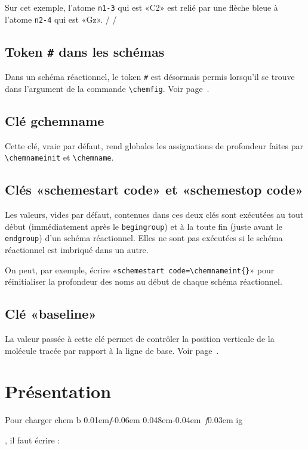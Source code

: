 \documentclass[10pt,french]{article}
\makeatletter
\newcommand\make@car@active[1]{%
	\catcode`#1\active
	\begingroup
		\lccode`\~`#1\relax
		\lowercase{\endgroup\def~}%
}
\newif\if@exstar
\newcommand\exemple{%
	\begingroup
	\parskip\z@
	\@makeother\;\@makeother\!\@makeother\?\@makeother\:%
	\@ifstar{\@exstartrue\exemple@}{\@exstarfalse\exemple@}}
\newcommand\exemple@[2][65]{%
	\medbreak\noindent
	\begingroup
		\let\do\@makeother\dospecials
		\make@car@active\ { {}}%
		\make@car@active\^^M{\par\leavevmode}%
		\make@car@active\^^I{\space\space}%
		\make@car@active\,{\leavevmode\kern\z@\string,}%
		\make@car@active\-{\leavevmode\kern\z@\string-}%
		\make@car@active\>{\leavevmode\kern\z@\string>}%
		\make@car@active\<{\leavevmode\kern\z@\string<}%
		\exemple@@{#1}{#2}%
}
\newcommand\exemple@@[3]{%
	\def\@tempa##1#3{\exemple@@@{#1}{#2}{##1}}%
	\@tempa
}
\newcommand\exemple@@@[3]{%
	\xdef\the@code{#3}%
	\endgroup
	\if@exstar
		\begingroup
			\fboxrule0.4pt
			\let\breakboxparindent\z@
			\def\bkvz@bottom{\hrule\@height\fboxrule}%
			\let\bkvz@before@breakbox\relax
			\def\bkvz@set@linewidth{\advance\linewidth\dimexpr-2\fboxrule-2\fboxsep}%
			\def\bkvz@left{\vrule\@width\fboxrule\hskip\fboxsep}%
			\def\bkvz@right{\hskip\fboxsep\vrule\@width\fboxrule}%
			\def\bkvz@top{\hbox to \hsize{%
				\vrule\@width\fboxrule\@height\fboxrule
				\leaders\bkvz@bottom\hfill
				\sffamily
				\fboxsep\z@
				\colorbox{black}{\kern0.25em\color{white}\footnotesize\lower0.5ex\hbox{\strut#2}\kern0.25em}%
				\leaders\bkvz@bottom\hfill
				\vrule\@width\fboxrule\@height\fboxrule}}%
			\breakbox
				\kern.5ex\relax
				\ttfamily\footnotesize\the@code\par
				\normalfont
				\kern3pt
				\hrule height0.1pt width\linewidth depth0.1pt
				\vskip5pt
				\rightskip0pt plus 1fill
				\everypar{{\color{lightgray}\rlap{\vrule height0.1pt width\linewidth depth0.1pt}}\hskip0pt plus 1fill}%
				\newlinechar`\^^M\everyeof{\noexpand}\scantokens{#3}\par
			\endbreakbox
		\endgroup
	\else
		\vskip0.5ex
		\boxput*(0,1)
			{\fboxsep\z@
			\hbox{\sffamily\colorbox{black}{\leavevmode\kern0.25em{\color{white}\footnotesize\strut#2}\kern0.25em}}%
			}%
			{\fboxsep5pt
			\fbox{%
				$\vcenter{\hsize\dimexpr0.#1\linewidth-\fboxsep-\fboxrule\relax
					\kern5pt\parskip0pt \ttfamily\footnotesize\the@code}%
				\vcenter{\kern5pt\hsize\dimexpr\linewidth-0.#1\linewidth-\fboxsep-\fboxrule\relax
					\everypar{{\color{lightgray}\rlap{\vrule height0.1pt width\dimexpr\linewidth-0.#1\linewidth-\fboxsep-\fboxrule depth0.1pt}}}%
					\footnotesize\newlinechar`\^^M\everyeof{\noexpand}\scantokens{#3}}$%
				}%
			}%
	\fi
	\medbreak
	\endgroup
}
\DeclareRobustCommand\CF{%
	\textsf{%
		chem%
		\if\string b\detokenize\expandafter{\f@series}%
			\lower0.01em\hbox{\itshape f}\kern-0.06em
		\else
			\lower0.048em\hbox{\kern-0.04em \itshape f}\kern0.03em
		\fi ig%
		}%
		\xspace
}
\makeatother
\begin{document}
Sur cet exemple, l'atome \verb|n1-3| qui est «C2» est relié par une flèche bleue à l'atome \verb|n2-4| qui est «Gz».
\exemple{Nom des nœuds}/
/

\subsection{Token \texttt\# dans les schémas}
Dans un schéma réactionnel, le token \verb|#| est désormais permis lorsqu'il se trouve dans l'argument de la commande \verb|\chemfig|. Voir  page~\pageref{modif.retrait}.

\subsection{Clé gchemname}
Cette clé, vraie par défaut, rend globales les assignations de profondeur faites par \verb|\chemnameinit| et \verb|\chemname|.

\subsection{Clés «schemestart code» et «schemestop code»}
Les valeurs, vides par défaut, contenues dans ces deux clés sont exécutées au tout début (immédiatement après le \verb|begingroup|) et à la toute fin (juste avant le \verb|endgroup|) d'un schéma réactionnel. Elles ne sont pas exécutées si le schéma réactionnel est imbriqué dans un autre.

On peut, par exemple, écrire «\verb|schemestart code=\chemnameint{}|» pour réinitialiser la profondeur des noms au début de chaque schéma réactionnel.

\subsection{Clé «baseline»}
La valeur passée à cette clé permet de contrôler la position verticale de la molécule tracée par rapport à la ligne de base. Voir page~\pageref{baseline}.

\section{Présentation}
Pour charger \CF, il faut écrire :
\end{document}
